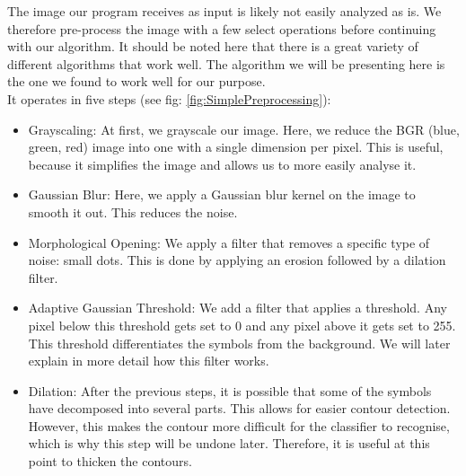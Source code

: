 \documentclass[12pt]{article}
\begin{document}
		The image our program receives as input is likely not easily analyzed as is.
		We therefore pre-process the image with a few select operations before continuing with our algorithm.
		It should be noted here that there is a great variety of different algorithms that work well.
		The algorithm we will be presenting here is the one we found to work well for our purpose.\\
		It operates in five steps (see fig: \ref{fig:SimplePreprocessing}):
		\begin{itemize}
			\item Grayscaling: At first, we grayscale our image.
			Here, we reduce the BGR (blue, green, red) image into one with a single dimension per pixel.
			This is useful, because it simplifies the image and allows us to more easily analyse it.
			\item Gaussian Blur: Here, we apply a Gaussian blur kernel on the image to smooth it out. This reduces the noise.
			\item Morphological Opening: We apply a filter that removes a specific type of noise: small dots. This is done by applying an erosion followed by a dilation filter. %
			\item Adaptive Gaussian Threshold: We add a filter that applies a threshold. 
			Any pixel below this threshold gets set to 0 and any pixel above it gets set to 255. %
			This threshold differentiates the symbols from the background.
			We will later explain in more detail how this filter works. %
			\item Dilation: After the previous steps, it is possible that some of the symbols have decomposed into several parts.
			This allows for easier contour detection.
			However, this makes the contour more difficult for the classifier to recognise, which is why this step will be undone later. %
			Therefore, it is useful at this point to thicken the contours.
		\end{itemize}
			
\end{document}
